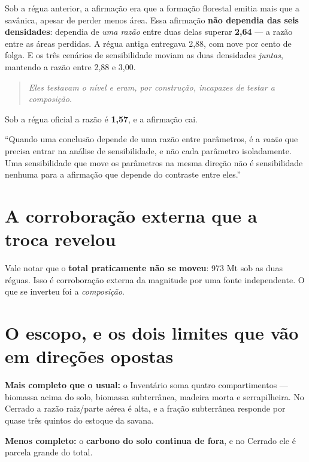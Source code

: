 Sob a régua anterior, a afirmação era que a formação florestal emitia mais que a
savânica, apesar de perder menos área. Essa afirmação \textbf{não dependia das
seis densidades}: dependia de \emph{uma razão} entre duas delas superar
\textbf{2,64} --- a razão entre as áreas perdidas. A régua antiga entregava
2,88, com nove por cento de folga. E os três cenários de sensibilidade moviam as
duas densidades \emph{juntas}, mantendo a razão entre 2,88 e 3,00.

\begin{quote}\itshape\color{cortinta}
Eles testavam o nível e eram, por construção, incapazes de testar a composição.
\end{quote}

Sob a régua oficial a razão é \textbf{1,57}, e a afirmação cai.

\begin{nabanca}
``Quando uma conclusão depende de uma razão entre parâmetros, é a \emph{razão}
que precisa entrar na análise de sensibilidade, e não cada parâmetro
isoladamente. Uma sensibilidade que move os parâmetros na mesma direção não é
sensibilidade nenhuma para a afirmação que depende do contraste entre eles.''
\end{nabanca}

\section{A corroboração externa que a troca revelou}

Vale notar que o \textbf{total praticamente não se moveu}: 973 Mt sob as duas
réguas. Isso é corroboração externa da magnitude por uma fonte independente. O
que se inverteu foi a \emph{composição}.

\section{O escopo, e os dois limites que vão em direções opostas}

\textbf{Mais completo que o usual:} o Inventário soma quatro compartimentos ---
biomassa acima do solo, biomassa subterrânea, madeira morta e serrapilheira. No
Cerrado a razão raiz/parte aérea é alta, e a fração subterrânea responde por
quase três quintos do estoque da savana.

\textbf{Menos completo:} o \textbf{carbono do solo continua de fora}, e no
Cerrado ele é parcela grande do total.

